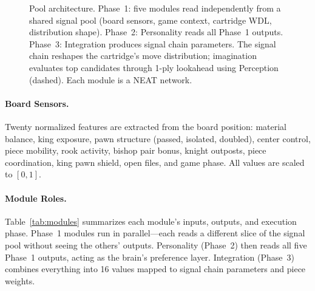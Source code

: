 \documentclass[11pt,a4paper]{article}
\begin{document}
\begin{figure}[t]
{
}
\caption{Pool architecture. Phase~1: five modules read independently from a shared signal pool (board sensors, game context, cartridge WDL, distribution shape). Phase~2: Personality reads all Phase~1 outputs. Phase~3: Integration produces signal chain parameters. The signal chain reshapes the cartridge's move distribution; imagination evaluates top candidates through 1-ply lookahead using Perception (dashed). Each module is a NEAT network.}
\label{fig:pipeline}
\end{figure}

\paragraph{Board Sensors.}
Twenty normalized features are extracted from the board position: material balance, king exposure, pawn structure (passed, isolated, doubled), center control, piece mobility, rook activity, bishop pair bonus, knight outposts, piece coordination, king pawn shield, open files, and game phase.
All values are scaled to $[0, 1]$.

\paragraph{Module Roles.}
Table~\ref{tab:modules} summarizes each module's inputs, outputs, and execution phase.
Phase~1 modules run in parallel---each reads a different slice of the signal pool without seeing the others' outputs.
Personality (Phase~2) then reads all five Phase~1 outputs, acting as the brain's preference layer.
Integration (Phase~3) combines everything into 16 values mapped to signal chain parameters and piece weights.
\end{document}
